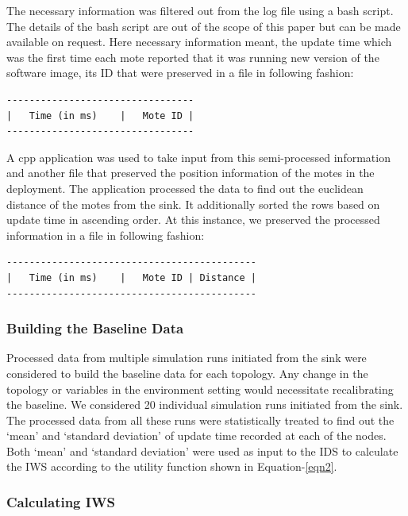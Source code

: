 \documentclass[conference,final]{IEEEtran}
\begin{document}
The necessary information was filtered out from the log file using a bash script. 
The details of the bash script are out of the scope of this paper but can be made available on request.
Here necessary information meant, the update time which was the first time each mote reported that it was running new version of the software image, its ID that were preserved in a file in following fashion:
\begin{verbatim}
---------------------------------
| 	Time (in ms)	|	Mote ID	|
---------------------------------
\end{verbatim}

A cpp application was used to take input from this semi-processed information and another file that preserved the position information of the motes in the deployment.
The application processed the data to find out the euclidean distance of the motes from the sink.
It additionally sorted the rows based on update time in ascending order.
At this instance, we preserved the processed information in a file in following fashion:
\begin{verbatim}
--------------------------------------------
| 	Time (in ms)	|	Mote ID	| Distance |
--------------------------------------------
\end{verbatim}

\subsubsection*{Building the Baseline Data}
\label{ssc:build_baseline}

Processed data from multiple simulation runs initiated from the sink were considered to build the baseline data for each topology.
Any change in the topology or variables in the environment setting would necessitate recalibrating the baseline.
We considered 20 individual simulation runs initiated from the sink.
The processed data from all these runs were statistically treated to find out the `mean' and `standard deviation' of update time recorded at each of the nodes.
Both `mean' and `standard deviation' were used as input to the IDS to calculate the IWS according to the utility function shown in Equation-\ref{eqn2}. 

\subsubsection*{Calculating IWS}
\label{ssc:calc_iws}
\end{document}
